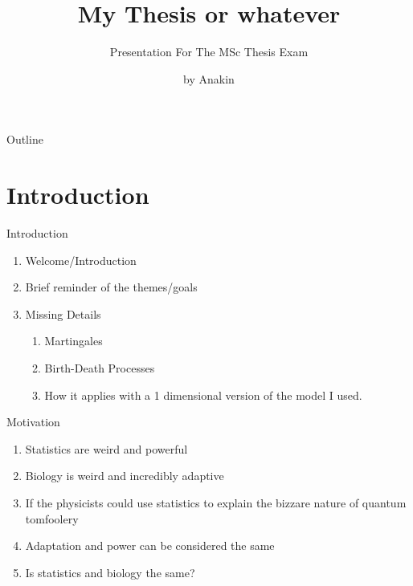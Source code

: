 \documentclass[aspectratio=169,  notheorems, sOuRcEs]{RUCPresentation}
\title{%
    My Thesis or whatever
}
\subtitle{Presentation For The MSc Thesis Exam}
\author{by Anakin}
\newcommand\makebeamertitle{\frame{\maketitle}}%
\begin{document}
\makebeamertitle


\begin{frame}{Outline}

    \tableofcontents

\end{frame}



\section{Introduction}
\begin{frame}{Introduction}

    \begin{enumerate}
        \item Welcome/Introduction
        \item Brief reminder of the themes/goals
        \item Missing Details
            \begin{enumerate}
                \item Martingales
                \item Birth-Death Processes
                \item How it applies with a 1 dimensional version of the model
                    I used.
            \end{enumerate}
    \end{enumerate}


\end{frame}


\begin{frame}{Motivation}

    \begin{enumerate}
        \item Statistics are weird and powerful
        \item Biology is weird and incredibly adaptive
        \item If the physicists could use statistics to explain the bizzare
            nature of quantum tomfoolery
        \item Adaptation and power can be considered the same
        \item Is statistics and biology the same?
    \end{enumerate}

\end{frame}
\end{document}
